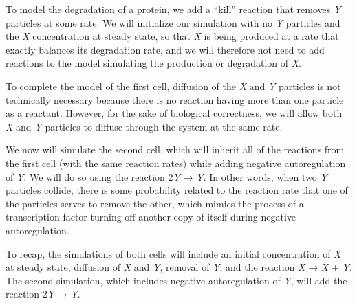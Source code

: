 To model the degradation of a protein, we add a ``kill'' reaction that removes \textit{Y} particles at some rate. We will initialize our simulation with no \textit{Y} particles and the \textit{X} concentration at steady state, so that \textit{X} is being produced at a rate that exactly balances its degradation rate, and we will therefore not need to add reactions to the model simulating the production or degradation of \textit{X}.

To complete the model of the first cell, diffusion of the \textit{X} and \textit{Y} particles is not technically necessary because there is no reaction having more than one particle as a reactant. However, for the sake of biological correctness, we will allow both \textit{X} and \textit{Y} particles to diffuse through the system at the same rate.

\begin{qbox}\end{qbox} 

We now will simulate the second cell, which will inherit all of the reactions from the first cell (with the same reaction rates) while adding negative autoregulation of \textit{Y}. We will do so using the reaction 2\textit{Y} → \textit{Y}. In other words, when two \textit{Y} particles collide, there is some probability related to the reaction rate that one of the particles serves to remove the other, which mimics the process of a transcription factor turning off another copy of itself during negative autoregulation.

To recap, the simulations of both cells will include an initial concentration of \textit{X} at steady state, diffusion of \textit{X} and \textit{Y}, removal of \textit{Y}, and the reaction \textit{X} → \textit{X} + \textit{Y}. The second simulation, which includes negative autoregulation of \textit{Y}, will add the reaction 2\textit{Y} → \textit{Y}. 

\begin{note}\end{note} 

